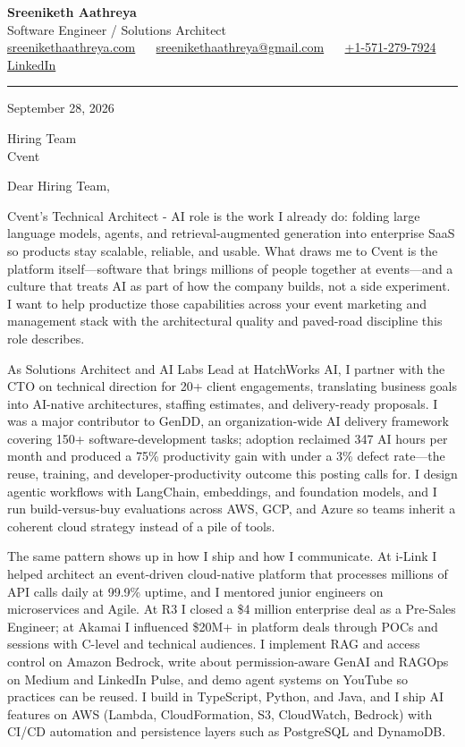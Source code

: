 \documentclass[11pt, letterpaper]{article}
\begin{document}
{\fontsize{18 pt}{20 pt}\selectfont\bfseries Sreeniketh Aathreya}\\[4pt]
Software Engineer / Solutions Architect\\[6pt]
\href{https://sreenikethaathreya.com}{sreenikethaathreya.com}
~\textbullet~
\href{mailto:sreenikethaathreya@gmail.com}{sreenikethaathreya@gmail.com}
~\textbullet~
\href{tel:+1-571-279-7924}{+1-571-279-7924}
~\textbullet~
\href{https://www.linkedin.com/in/sreeniketh-aathreya-16800b122/}{LinkedIn}

\vspace{12pt}
\hrule
\vspace{12pt}

September 28, 2026

\vspace{8pt}

Hiring Team\\
Cvent

\vspace{12pt}

Dear Hiring Team,

Cvent's Technical Architect - AI role is the work I already do: folding large language models, agents, and retrieval-augmented generation into enterprise SaaS so products stay scalable, reliable, and usable. What draws me to Cvent is the platform itself---software that brings millions of people together at events---and a culture that treats AI as part of how the company builds, not a side experiment. I want to help productize those capabilities across your event marketing and management stack with the architectural quality and paved-road discipline this role describes.

As Solutions Architect and AI Labs Lead at HatchWorks AI, I partner with the CTO on technical direction for 20+ client engagements, translating business goals into AI-native architectures, staffing estimates, and delivery-ready proposals. I was a major contributor to GenDD, an organization-wide AI delivery framework covering 150+ software-development tasks; adoption reclaimed 347 AI hours per month and produced a 75\% productivity gain with under a 3\% defect rate---the reuse, training, and developer-productivity outcome this posting calls for. I design agentic workflows with LangChain, embeddings, and foundation models, and I run build-versus-buy evaluations across AWS, GCP, and Azure so teams inherit a coherent cloud strategy instead of a pile of tools.

The same pattern shows up in how I ship and how I communicate. At i-Link I helped architect an event-driven cloud-native platform that processes millions of API calls daily at 99.9\% uptime, and I mentored junior engineers on microservices and Agile. At R3 I closed a \$4 million enterprise deal as a Pre-Sales Engineer; at Akamai I influenced \$20M+ in platform deals through POCs and sessions with C-level and technical audiences. I implement RAG and access control on Amazon Bedrock, write about permission-aware GenAI and RAGOps on Medium and LinkedIn Pulse, and demo agent systems on YouTube so practices can be reused. I build in TypeScript, Python, and Java, and I ship AI features on AWS (Lambda, CloudFormation, S3, CloudWatch, Bedrock) with CI/CD automation and persistence layers such as PostgreSQL and DynamoDB.
\end{document}
